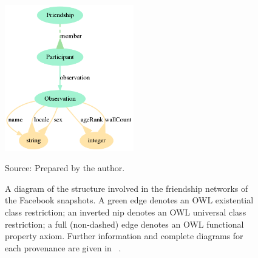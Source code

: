\begin{figure}[!ht]
	\centering
	\caption{A diagram of the structure involved in the friendship networks
	of the Facebook snapshots.
	A green edge denotes an OWL existential class restriction;
	an inverted nip denotes an OWL universal class restriction;
	a full (non-dashed) edge denotes an OWL functional property axiom.
	Further information and complete diagrams for each provenance are given in ~\cite{losd}.}\label{dia}
	\includegraphics[width=0.5\textwidth]{ontologies/facebook-legacy-AntonioAnzoategui18022013Friendship.ttl/draw}
	\begin{flushleft}
		Source: Prepared by the author.\
	\end{flushleft}
\end{figure}


